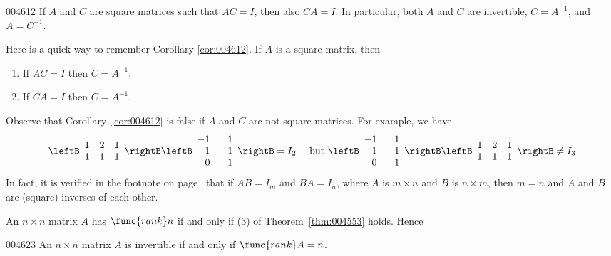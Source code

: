 \begin{corollary}[code={\setcounter{\tcbcounter}{0}}]{}{004612}
If $A$ and $C$ are square matrices such that $AC = I$, then also $CA = I$. In particular, both $A$ and $C$ are invertible, $C = A^{-1}$, and $A = C^{-1}$.
\end{corollary}

Here is a quick way to remember Corollary \ref{cor:004612}. If $A$ is a square matrix, then 
\begin{enumerate}
\item If $AC=I$ then $C=A^{-1}$.
\item If $CA=I$ then $C=A^{-1}$.
\end{enumerate}

\noindent Observe that Corollary~\ref{cor:004612} is false if $A$ and $C$ are not square matrices. For example, we have
\begin{equation*}
\leftB \begin{array}{rrr}
1 & 2 & 1 \\
1 & 1 & 1
\end{array} \rightB \leftB \begin{array}{rr}
-1 & 1 \\
1 & -1 \\
0 & 1
\end{array} \rightB = I_{2} \quad \mbox{ but } 
\leftB \begin{array}{rr}
-1 & 1 \\
1 & -1 \\
0 & 1
\end{array} \rightB \leftB \begin{array}{rrr}
1 & 2 & 1 \\
1 & 1 & 1
\end{array} \rightB \neq I_{3}
\end{equation*}
In fact, it is verified in the footnote on page~\pageref{fn:inversematrices} that if $AB = I_{m}$ and $BA = I_{n}$, where $A$ is $m \times n$ and $B$ is $n \times m$, then $m = n$ and $A$ and $B$ are (square) inverses of each other.


An $n \times n$ matrix $A$ has $\func{rank }n$ if and only if (3) of Theorem~\ref{thm:004553} holds. Hence


\begin{corollary}{}{004623}
An $n \times n$ matrix $A$ is invertible if and only if $\func{rank }A = n$.
\end{corollary}

